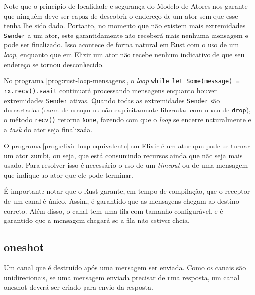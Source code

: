 Note que o princípio de localidade e segurança do Modelo de Atores nos garante que ninguém deve ser capaz de descobrir o endereço de um ator sem que esse tenha lhe sido dado. Portanto, no momento que não existem mais extremidades \texttt{Sender} a um ator, este garantidamente não receberá mais nenhuma mensagem e pode ser finalizado. Isso acontece de forma natural em Rust com o uso de um \emph{loop}, enquanto que em Elixir um ator não recebe nenhum indicativo de que seu endereço se tornou desconhecido.

\begin{program}
  
  \caption{Exemplo de loop de recebimento de mensagens.\label{prog:rust-loop-mensagens}}
\end{program}

No programa \ref{prog:rust-loop-mensagens}, o \emph{loop} \texttt{while let Some(message) = rx.recv().await} continuará processando mensagens enquanto houver extremidades \texttt{Sender} ativas. Quando todas as extremidades \texttt{Sender} são descartadas (saem de escopo ou são explicitamente liberadas com o uso de \texttt{drop}), o método \texttt{recv()} retorna \texttt{None}, fazendo com que o \emph{loop} se encerre naturalmente e a \emph{task} do ator seja finalizada.

\begin{program}
  
  \caption{Exemplo equivalente em Elixir.\label{prog:elixir-loop-equivalente}}
\end{program}

O programa \ref{prog:elixir-loop-equivalente} em Elixir é um ator que pode se tornar um ator zumbi, ou seja, que está consumindo recursos ainda que não seja mais usado. Para resolver isso é necessário o uso de um \emph{timeout} ou de uma mensagem que indique ao ator que ele pode terminar.

É importante notar que o Rust garante, em tempo de compilação, que o receptor de um canal é único. Assim, é garantido que as mensagens chegam ao destino correto. Além disso, o canal tem uma fila com tamanho configurável, e é garantido que a mensagem chegará se a fila não estiver cheia.

\subsection{oneshot}

Um canal que é destruído após uma mensagem ser enviada. Como os canais são unidirecionais, se uma mensagem enviada precisar de uma resposta, um canal oneshot deverá ser criado para envio da resposta.

